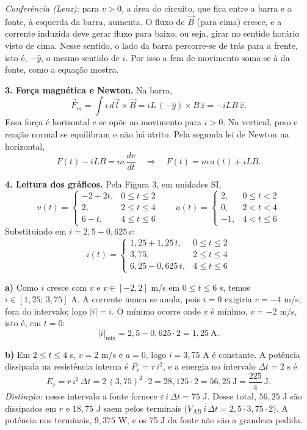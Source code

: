 \documentclass{article}%
\begin{document}
\textit{Conferência (Lenz):} para $v>0$, a área do circuito, que fica entre a barra e a fonte, à esquerda da barra, aumenta. O fluxo de $\vec B$ (para cima) cresce, e a corrente induzida deve gerar fluxo para baixo, ou seja, girar no sentido horário visto de cima. Nesse sentido, o lado da barra percorre-se de trás para a frente, isto é, $-\hat y$, o mesmo sentido de $i$. Por isso a fem de movimento soma-se à da fonte, como a equação mostra.

\textbf{3. Força magnética e Newton.} Na barra,
\[
\vec F_m=\int i\,d\vec l\times\vec B = iL\,(-\hat y)\times B\,\hat z=-iLB\,\hat x .
\]
Essa força é horizontal e se opõe ao movimento para $i>0$. Na vertical, peso e reação normal se equilibram e não há atrito. Pela segunda lei de Newton na horizontal,
\[
F(t)-iLB=m\,\frac{dv}{dt}\quad\Rightarrow\quad F(t)=m\,a(t)+iLB .
\]

\textbf{4. Leitura dos gráficos.} Pela Figura 3, em unidades SI,
\[
v(t)=\begin{cases}-2+2t, & 0\le t\le 2\\ 2, & 2\le t\le 4\\ 6-t, & 4\le t\le 6\end{cases}
\qquad
a(t)=\begin{cases}2, & 0\le t<2\\ 0, & 2<t<4\\ -1, & 4<t\le 6\end{cases}
\]
Substituindo em $i=2{,}5+0{,}625\,v$:
\[
i(t)=\begin{cases}1{,}25+1{,}25\,t, & 0\le t\le 2\\ 3{,}75, & 2\le t\le 4\\ 6{,}25-0{,}625\,t, & 4\le t\le 6\end{cases}
\]

\textbf{a)} Como $i$ cresce com $v$ e $v\in[-2,2]$ m/s em $0\le t\le 6$ s, temos $i\in[1{,}25;\,3{,}75]$ A. A corrente nunca se anula, pois $i=0$ exigiria $v=-4$ m/s, fora do intervalo; logo $|i|=i$. O mínimo ocorre onde $v$ é mínimo, $v=-2$ m/s, isto é, em $t=0$:
\[
|i|_{\min}=2{,}5-0{,}625\cdot 2=1{,}25\ \text{A}.
\]

\textbf{b)} Em $2\le t\le 4$ s, $v=2$ m/s e $a=0$, logo $i=3{,}75$ A é constante. A potência dissipada na resistência interna é $P_r=r\,i^2$, e a energia no intervalo $\Delta t=2$ s é
\[
E_r=r\,i^2\,\Delta t=2\,(3{,}75)^2\cdot 2=28{,}125\cdot 2=56{,}25\ \text{J}=\frac{225}{4}\ \text{J}.
\]
\textit{Distinção:} nesse intervalo a fonte fornece $\varepsilon\,i\,\Delta t=75$ J. Desse total, $56{,}25$ J são dissipados em $r$ e $18{,}75$ J saem pelos terminais ($V_{AB}\,i\,\Delta t=2{,}5\cdot 3{,}75\cdot 2$). A potência nos terminais, $9{,}375$ W, e os 75 J da fonte não são a grandeza pedida.
\end{document}
